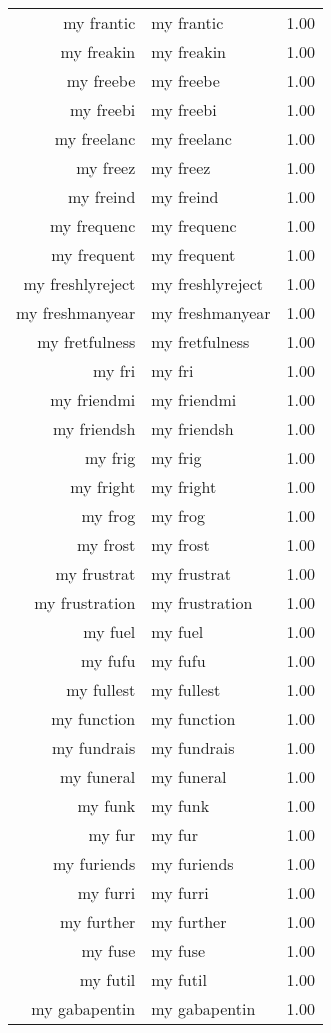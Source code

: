\begin{table}[ht]
\begin{tabular}{rlr}
  my frantic & my frantic & 1.00 \\ 
  my freakin & my freakin & 1.00 \\ 
  my freebe & my freebe & 1.00 \\ 
  my freebi & my freebi & 1.00 \\ 
  my freelanc & my freelanc & 1.00 \\ 
  my freez & my freez & 1.00 \\ 
  my freind & my freind & 1.00 \\ 
  my frequenc & my frequenc & 1.00 \\ 
  my frequent & my frequent & 1.00 \\ 
  my freshlyreject & my freshlyreject & 1.00 \\ 
  my freshmanyear & my freshmanyear & 1.00 \\ 
  my fretfulness & my fretfulness & 1.00 \\ 
  my fri & my fri & 1.00 \\ 
  my friendmi & my friendmi & 1.00 \\ 
  my friendsh & my friendsh & 1.00 \\ 
  my frig & my frig & 1.00 \\ 
  my fright & my fright & 1.00 \\ 
  my frog & my frog & 1.00 \\ 
  my frost & my frost & 1.00 \\ 
  my frustrat & my frustrat & 1.00 \\ 
  my frustration & my frustration & 1.00 \\ 
  my fuel & my fuel & 1.00 \\ 
  my fufu & my fufu & 1.00 \\ 
  my fullest & my fullest & 1.00 \\ 
  my function & my function & 1.00 \\ 
  my fundrais & my fundrais & 1.00 \\ 
  my funeral & my funeral & 1.00 \\ 
  my funk & my funk & 1.00 \\ 
  my fur & my fur & 1.00 \\ 
  my furiends & my furiends & 1.00 \\ 
  my furri & my furri & 1.00 \\ 
  my further & my further & 1.00 \\ 
  my fuse & my fuse & 1.00 \\ 
  my futil & my futil & 1.00 \\ 
  my gabapentin & my gabapentin & 1.00 \\ 

\end{tabular}
\end{table}
